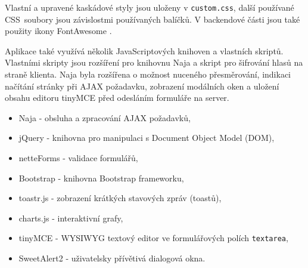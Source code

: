 Vlastní a upravené kaskádové styly jsou uloženy v \texttt{custom.css}, další používané CSS~soubory jsou závislostmi používaných balíčků. V backendové části jsou také použity ikony FontAwesome \cite{FontAwesome}.


Aplikace také využívá několik JavaScriptových knihoven a vlastních skriptů. Vlastními skripty jsou rozšíření pro knihovnu Naja a skript pro šifrování hlasů na straně klienta. Naja byla rozšířena o možnost nuceného přesměrování, indikaci načítání stránky při AJAX požadavku, zobrazení modálních oken a uložení obsahu editoru tinyMCE před odesláním formuláře na server.
\begin{itemize}
	\item Naja - obsluha a zpracování AJAX požadavků,
	\item jQuery - knihovna pro manipulaci s Document Object Model (DOM),
	\item netteForms - validace formulářů,
	\item Bootstrap - knihovna Bootstrap frameworku,
	\item toastr.js - zobrazení krátkých stavových zpráv (toastů),
	\item charts.js - interaktivní grafy,
	\item tinyMCE - WYSIWYG textový editor ve formulářových polích \texttt{textarea},
	\item SweetAlert2 - uživatelsky přívětivá dialogová okna.
\end{itemize}
